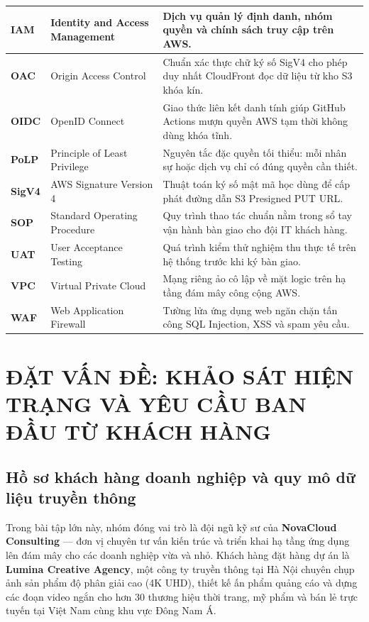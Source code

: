 \documentclass[12pt,a4paper]{report}
\begin{document}
\begin{longtable}{|L{2.4cm}|L{4.8cm}|L{7.2cm}|}
  \textbf{IAM} & Identity and Access Management & Dịch vụ quản lý định danh, nhóm quyền và chính sách truy cập trên AWS. \\ \hline
  \textbf{OAC} & Origin Access Control & Chuẩn xác thực chữ ký số SigV4 cho phép duy nhất CloudFront đọc dữ liệu từ kho S3 khóa kín. \\ \hline
  \textbf{OIDC} & OpenID Connect & Giao thức liên kết danh tính giúp GitHub Actions mượn quyền AWS tạm thời không dùng khóa tĩnh. \\ \hline
  \textbf{PoLP} & Principle of Least Privilege & Nguyên tắc đặc quyền tối thiểu: mỗi nhân sự hoặc dịch vụ chỉ có đúng quyền cần thiết. \\ \hline
  \textbf{SigV4} & AWS Signature Version 4 & Thuật toán ký số mật mã học dùng để cấp phát đường dẫn S3 Presigned PUT URL. \\ \hline
  \textbf{SOP} & Standard Operating Procedure & Quy trình thao tác chuẩn nằm trong sổ tay vận hành bàn giao cho đội IT khách hàng. \\ \hline
  \textbf{UAT} & User Acceptance Testing & Quá trình kiểm thử nghiệm thu thực tế trên hệ thống trước khi ký bàn giao. \\ \hline
  \textbf{VPC} & Virtual Private Cloud & Mạng riêng ảo cô lập về mặt logic trên hạ tầng đám mây công cộng AWS. \\ \hline
  \textbf{WAF} & Web Application Firewall & Tường lửa ứng dụng web ngăn chặn tấn công SQL Injection, XSS và spam yêu cầu. \\ \hline
\end{longtable}

\clearpage
{}

\chapter{ĐẶT VẤN ĐỀ: KHẢO SÁT HIỆN TRẠNG VÀ YÊU CẦU BAN ĐẦU TỪ KHÁCH HÀNG}

\section{Hồ sơ khách hàng doanh nghiệp và quy mô dữ liệu truyền thông}
Trong bài tập lớn này, nhóm đóng vai trò là đội ngũ kỹ sư của \textbf{NovaCloud Consulting} --- đơn vị chuyên tư vấn kiến trúc và triển khai hạ tầng ứng dụng lên đám mây cho các doanh nghiệp vừa và nhỏ. Khách hàng đặt hàng dự án là \textbf{Lumina Creative Agency}, một công ty truyền thông tại Hà Nội chuyên chụp ảnh sản phẩm độ phân giải cao (4K UHD), thiết kế ấn phẩm quảng cáo và dựng các đoạn video ngắn cho hơn 30 thương hiệu thời trang, mỹ phẩm và bán lẻ trực tuyến tại Việt Nam cùng khu vực Đông Nam Á.
\end{document}
